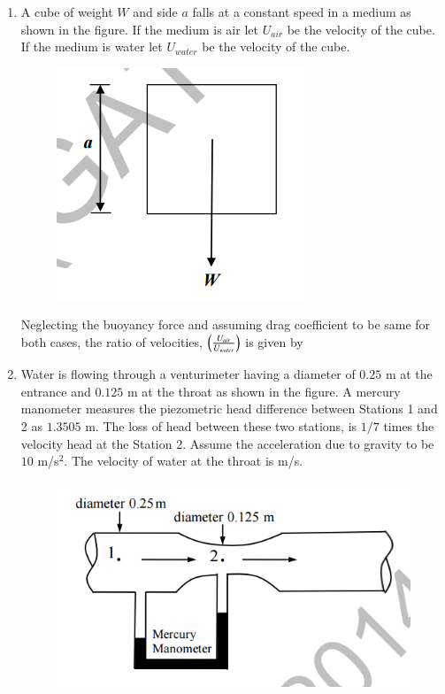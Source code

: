 \documentclass[a4paper,10pt]{article}
\begin{document}
\begin{enumerate}
    \item A cube of weight $W$ and side $a$ falls at a constant speed in a medium as shown in the figure. If the medium is air  let $U_{air}$ be the velocity of the cube. If the medium is water  let $U_{water}$ be the velocity of the cube.
    \begin{figure}[H] \centering \includegraphics[width=0.3\columnwidth]{Bq21.png} \caption*{} \label{fig:q21_fluid} \end{figure}
    Neglecting the buoyancy force and assuming drag coefficient to be same for both cases, the ratio of velocities, $\left(\frac{U_{air}}{U_{water}}\right)$ is given by
    
    \hfill{}
    \begin{enumerate}
    \end{enumerate}

    \item Water is flowing through a venturimeter having a diameter of $0.25$ m at the entrance  and $0.125$ m at the throat  as shown in the figure. A mercury manometer measures the piezometric head difference between Stations 1 and 2 as $1.3505$ m. The loss of head between these two stations, is $1/7$ times the velocity head at the Station 2. Assume the acceleration due to gravity to be $10$ m/s$^2$. The velocity of water at the throat is \underline{\hspace{2cm}} m/s.
    \begin{figure}[H] \centering \includegraphics[width=0.6\columnwidth]{Bq22.png} \caption*{} \label{fig:q22_fluid} \end{figure}
    
    \hfill{}
\end{enumerate}
\clearpage
\end{document}
